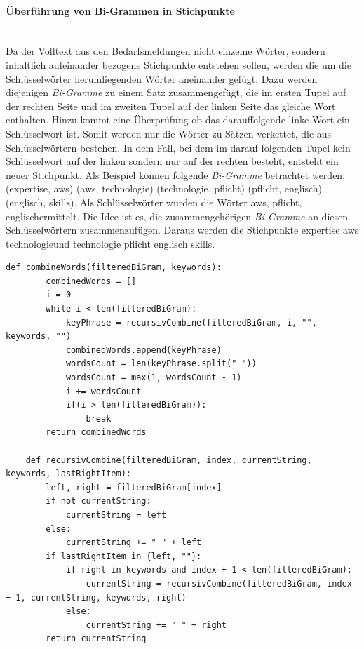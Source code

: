 \paragraph{Überführung von Bi-Grammen in Stichpunkte}\label{par:stichpunkte}\mbox{}\\
Da der Volltext aus den Bedarfsmeldungen nicht einzelne Wörter, sondern inhaltlich aufeinander bezogene Stichpunkte entstehen sollen, werden die um die Schlüsselwörter herumliegenden Wörter aneinander gefügt. Dazu werden diejenigen \emph{Bi-Gramme} zu einem Satz zusammengefügt, die im ersten Tupel auf der rechten Seite und im zweiten Tupel auf der linken Seite das gleiche Wort enthalten. Hinzu kommt eine Überprüfung ob das darauffolgende linke Wort ein Schlüsselwort ist. Somit werden nur die Wörter zu Sätzen verkettet, die aus Schlüsselwörtern bestehen. In dem Fall, bei dem im darauf folgenden Tupel kein Schlüsselwort auf der linken sondern nur auf der rechten besteht, entsteht ein neuer Stichpunkt. Als Beispiel können folgende \emph{Bi-Gramme} betrachtet werden: (\grqq expertise\grqq, \grqq aws\grqq) (\grqq aws\grqq, \grqq technologie\grqq) (\grqq technologie\grqq, \grqq pflicht\grqq) (\grqq pflicht\grqq, \grqq englisch\grqq) (\grqq englisch\grqq, \grqq skills\grqq). Als Schlüsselwörter wurden die Wörter \grqq aws\grqq, \grqq pflicht\grqq, \grqq englisch\grqq ermittelt. Die Idee ist es, die zusammengehörigen \emph{Bi-Gramme} an diesen Schlüsselwörtern zusammenzufügen. Daraus werden die Stichpunkte \grqq expertise aws technologie\grqq und \grqq technologie pflicht englisch skills\grqq.
\begin{lstlisting}[caption={Umformung der Bi-Gramm Liste in Stichpunkte}, label=lst:stichpunkte]
	def combineWords(filteredBiGram, keywords):
		combinedWords = []
		i = 0
		while i < len(filteredBiGram):
			keyPhrase = recursivCombine(filteredBiGram, i, "", keywords, "")
			combinedWords.append(keyPhrase)
			wordsCount = len(keyPhrase.split(" "))
			wordsCount = max(1, wordsCount - 1)
			i += wordsCount
			if(i > len(filteredBiGram)):
				break
		return combinedWords
	
	def recursivCombine(filteredBiGram, index, currentString, keywords, lastRightItem):
		left, right = filteredBiGram[index]
		if not currentString:
			currentString = left
		else:
			currentString += " " + left
		if lastRightItem in {left, ""}:
			if right in keywords and index + 1 < len(filteredBiGram):
				currentString = recursivCombine(filteredBiGram, index + 1, currentString, keywords, right)
			else:
				currentString += " " + right
		return currentString
\end{lstlisting}
